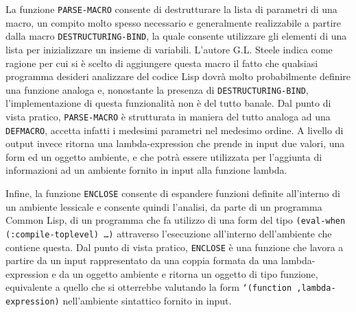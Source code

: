 La funzione \texttt{PARSE-MACRO} consente di destrutturare la lista di parametri
di una macro, un compito molto spesso necessario e generalmente realizzabile a
partire dalla macro \texttt{DESTRUCTURING-BIND}, la quale consente utilizzare
gli elementi di una lista per inizializzare un insieme di variabili. L’autore
G.L. Steele indica come ragione per cui si è scelto di aggiungere questa macro
il fatto che qualsiasi programma desideri analizzare del codice Lisp dovrà molto
probabilmente definire una funzione analoga e, nonostante la presenza di \texttt
{DESTRUCTURING-BIND}, l’implementazione di questa funzionalità non è del tutto
banale. \cite{steele1990common} Dal punto di vista pratico,
\texttt{PARSE-MACRO} è strutturata in maniera del tutto analoga ad una
\texttt{DEFMACRO}, accetta infatti i medesimi parametri nel medesimo ordine. A
livello di output invece ritorna una lambda-expression che prende in input due
valori, una form ed un oggetto ambiente, e che potrà essere utilizzata per
l'aggiunta di informazioni ad un ambiente fornito in input alla funzione
lambda.

Infine, la funzione \texttt{ENCLOSE} consente di espandere funzioni definite
all’interno di un ambiente lessicale e consente quindi l’analisi, da parte di un
programma Common Lisp, di un programma che fa utilizzo di una form del tipo
\texttt{(eval-when (:compile-toplevel) …)} attraverso l’esecuzione all’interno
dell’ambiente che contiene questa. Dal punto di vista pratico, \texttt{ENCLOSE}
è una funzione che lavora a partire da un input rappresentato da una coppia
formata da una lambda-expression e da un oggetto ambiente e ritorna un oggetto
di tipo funzione, equivalente a quello che si otterrebbe valutando la form
\texttt{`(function ,lambda-expression)} nell'ambiente sintattico fornito in
input.
